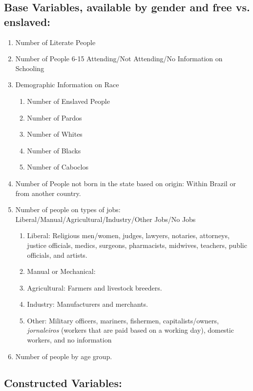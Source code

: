 \documentclass{article}
\begin{document}
\subsection{Base Variables, available by gender and free vs. enslaved:}

\begin{enumerate}
  \item Number of Literate People
  \item Number of People 6-15 Attending/Not Attending/No Information on Schooling
  \item Demographic Information on Race
    \begin{enumerate}
      \item Number of Enslaved People
      \item Number of Pardos
      \item Number of Whites
      \item Number of Blacks
      \item Number of Caboclos
    \end{enumerate}
  \item Number of People not born in the state based on origin: Within Brazil or from another country.
  \item Number of people on types of jobs: Liberal/Manual/Agricultural/Industry/Other Jobs/No Jobs
    \begin{enumerate}
      \item Liberal: Religious men/women, judges, lawyers, notaries, attorneys, justice officials, medics, surgeons, pharmacists, midwives, teachers, public officials, and artists.
      \item Manual or Mechanical: 
      \item Agricultural: Farmers and livestock breeders.
      \item Industry: Manufacturers and merchants.
      \item Other: Military officers, mariners, fishermen, capitalists/owners, \textit{jornaleiros} (workers that are paid based on a working day), domestic workers, and no information
    \end{enumerate}
  \item Number of people by age group.
\end{enumerate}

\subsection{Constructed Variables:}
\end{document}
